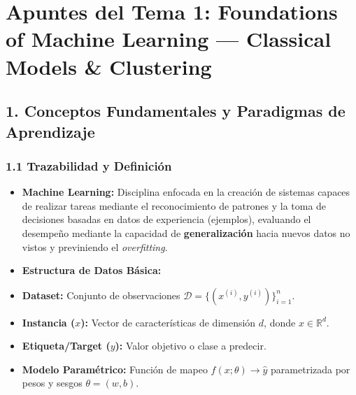 \documentclass[11pt,oneside]{article}
\begin{document}
\tableofcontents
\clearpage
{}
\section{Apuntes del Tema 1: Foundations of Machine Learning — Classical Models \& Clustering}

\subsection{1. Conceptos Fundamentales y Paradigmas de Aprendizaje}

\subsubsection{1.1 Trazabilidad y Definición}

\begin{itemize}

\item \textbf{Machine Learning:} Disciplina enfocada en la creación de sistemas capaces de realizar tareas mediante el reconocimiento de patrones y la toma de decisiones basadas en datos de experiencia (ejemplos), evaluando el desempeño mediante la capacidad de \textbf{generalización} hacia nuevos datos no vistos y previniendo el \emph{overfitting}.

\item \textbf{Estructura de Datos Básica:}

\item \textbf{Dataset:} Conjunto de observaciones \(\mathcal{D} = \{(x^{(i)}, y^{(i)})\}_{i=1}^{n}\).

\item \textbf{Instancia (\(x\)):} Vector de características de dimensión \(d\), donde \(x \in \mathbb{R}^d\).

\item \textbf{Etiqueta/Target (\(y\)):} Valor objetivo o clase a predecir.

\item \textbf{Modelo Paramétrico:} Función de mapeo \(f(x; \theta) \rightarrow \hat{y}\) parametrizada por pesos y sesgos \(\theta = (w, b)\).

\end{itemize}
\end{document}
